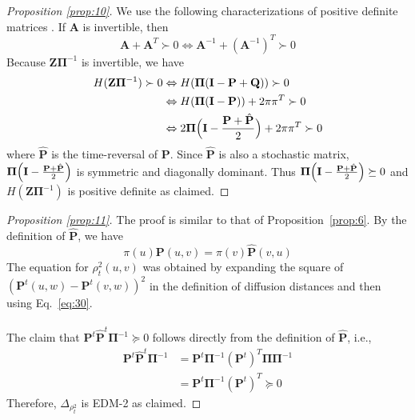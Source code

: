 \documentclass[10pt,twocolumn]{article}
\numberwithin{equation}{section}
\begin{document}
\begin{proof}[Proposition \ref{prop:10}]
  We use the
  following characterizations of positive definite matrices
  \cite{boley09:_gener_laplac,horn94:_topic_in_matrix_analy}. If
  $\mathbf{A}$ is invertible, then
  \begin{equation}
    \label{eq:28}
    \mathbf{A} + \mathbf{A}^{T} \succ 0 \Leftrightarrow
    \mathbf{A}^{-1} + (\mathbf{A}^{-1})^{T} \succ 0
  \end{equation}
  Because $\mathbf{Z}\bm{\Pi}^{-1}$ is invertible, we have
  \begin{equation*}
    \begin{split}
      H(\mathbf{Z}\bm{\Pi}^{-1}) \succ 0
      & \Leftrightarrow H(\bm{\Pi}(\mathbf{I} - \mathbf{P} + \mathbf{Q})) \succ 0  \\
      & \Leftrightarrow H(\bm{\Pi}(\mathbf{I} - \mathbf{P})) + 2 \pi \pi^{T} \succ 0 \\
      & \Leftrightarrow 2 \bm{\Pi}\Bigl(\mathbf{I} - \frac{\mathbf{P}
        + \hat{\mathbf{P}}}{2}\Bigr) + 2\pi\pi^{T} \succ 0
   \end{split}
  \end{equation*}
  where $\hat{\mathbf{P}}$ is the time-reversal of $\mathbf{P}$. Since
  $\hat{\mathbf{P}}$ is also a stochastic matrix,
  $\bm{\Pi}\Bigl(\mathbf{I} - \tfrac{\mathbf{P} +
    \hat{\mathbf{P}}}{2}\Bigr)$ is symmetric and diagonally
  dominant. Thus $\bm{\Pi}\Bigl(\mathbf{I} - \tfrac{\mathbf{P} +
    \hat{\mathbf{P}}}{2}\Bigr) \succeq 0$ and
  $H(\mathbf{Z}\bm{\Pi}^{-1})$ is positive definite as claimed.
\end{proof}
\begin{proof}[Proposition \ref{prop:11}]
  The proof is similar to that of Proposition~\ref{prop:6}. By the
  definition of $\hat{\mathbf{P}}$, we have
  \begin{equation}
    \label{eq:30}
    \pi(u) \mathbf{P}(u,v) = \pi(v) \hat{\mathbf{P}}(v,u)
  \end{equation}
  The equation for $\rho_{t}^{2}(u,v)$ was obtained by expanding the
  square of $(\mathbf{P}^{t}(u,w) - \mathbf{P}^{t}(v,w))^{2}$ in the
  definition
  of diffusion distances and then using Eq.~\eqref{eq:30}. \\ \\
  \noindent The claim that
  $\mathbf{P}^{t}\hat{\mathbf{P}}^{t}\bm{\Pi}^{-1} \succeq 0$ follows
  directly from the definition of $\hat{\mathbf{P}}$, i.e.,
  \begin{equation*}
    \begin{split}
      \mathbf{P}^{t}\hat{\mathbf{P}}^{t}\bm{\Pi}^{-1} &= 
      \mathbf{P}^{t}\bm{\Pi}^{-1}(\mathbf{P}^{t})^{T}\bm{\Pi}\bm{\Pi}^{-1}
      \\
      & = \mathbf{P}^{t}\bm{\Pi}^{-1}(\mathbf{P}^{t})^{T} \succeq 0
    \end{split}
  \end{equation*}
 Therefore, $\Delta_{\rho_{t}^2}$ is EDM-2 as claimed.
\end{proof}
\end{document}
